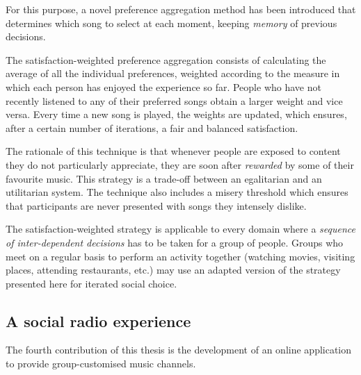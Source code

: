 For this purpose, a novel preference aggregation method has been introduced that determines which song to select at each moment, keeping \emph{memory} of previous decisions.

The satisfaction-weighted preference aggregation consists of calculating the average of all the individual preferences, weighted according to the measure in which each person has enjoyed the experience so far.
People who have not recently listened to any of their preferred songs obtain a larger weight and vice versa.
%
Every time a new song is played, the weights are updated, which ensures, after a certain number of iterations, a fair and balanced satisfaction.

The rationale of this technique is that whenever people are exposed to content they do not particularly appreciate, they are soon after \emph{rewarded} by some of their favourite music.
This strategy is %
a trade-off between an egalitarian and an utilitarian system.
The technique also includes a misery threshold which ensures that participants are never presented with songs they intensely dislike.

The satisfaction-weighted strategy is applicable to every domain where a \emph{sequence of inter-dependent decisions} has to be taken for a group of people.
Groups who meet on a regular basis to perform an activity together (watching movies, visiting places, attending restaurants, etc.) may use an adapted version of the strategy presented here for iterated social choice.






\subsection{A social radio experience} %
\label{sub:a_social_radio_experience}

The fourth contribution of this thesis is the development of an online application to provide group-customised music channels.

